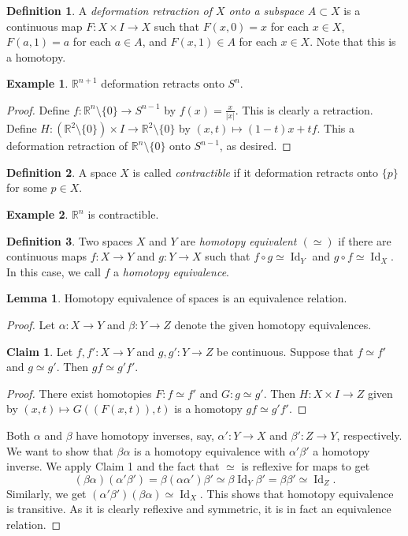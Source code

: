 \documentclass[10pt,letterpaper,cm]{nupset}
\theoremstyle{definition}
\newtheorem*{definition}{Definition}
\newtheorem{exmp}{Example}
\newtheorem{claim}{Claim}
\newtheorem{lemma}{Lemma}
\newcommand{\R}{\mathbb R}
\newcommand{\1}{\mathbf{1}}
\newcommand{\0}{\vec 0}
\DeclareMathOperator{\id}{Id}
\begin{document}
\begin{definition}
A \textit{deformation retraction of $X$ onto a subspace $A\subset X$} is a continuous map $F: X \times I \to X$ such that $F(x, 0) = x$ for each $x\in X$, $F(a, 1) = a$ for each $a\in A$, and $F(x, 1) \in A$ for each $x\in X$. Note that this is a homotopy. 
\end{definition}

\begin{exmp}  $\R^{n+1}$ deformation retracts onto $S^n$. 
\end{exmp}
\begin{proof}
Define $f: \R^n \setminus \{0\} \to S^{n-1}$ by $f(x) = \frac{x}{|x|}$. This is clearly a retraction. Define $H : (\R^2 \setminus \{0\}) \times I \to \R^2 \setminus \{0\}$ by $(x, t) \mapsto (1-t)x +tf$. This a deformation retraction of $ \R^n \setminus \{0\}$ onto $S^{n-1}$, as desired. 
\end{proof}

\begin{definition}
A space $X$ is called \textit{contractible} if it deformation retracts onto $\{p\}$ for some $p\in X$.
\end{definition}

\begin{exmp}
$\R^n$ is contractible.
\end{exmp}

\begin{definition}
Two spaces $X$ and $Y$ are \textit{homotopy equivalent $(\simeq)$} if there are continuous maps $f: X\to Y$ and $g: Y \to X$ such that $f\circ g \simeq \id_Y$ and $g\circ f \simeq \id_X$. In this case, we call $f$ a \textit{homotopy equivalence}.
\end{definition}

\begin{lemma}
Homotopy equivalence of spaces is an equivalence relation.
\end{lemma}
\begin{proof}
Let $\alpha : X \to Y$ and $\beta: Y \to Z$ denote the given homotopy equivalences. 
\begin{claim}
Let $f, f': X \to Y$ and $g,g' : Y \to Z$ be continuous. Suppose that $f\simeq f'$ and $g \simeq g'$. Then $gf \simeq g'f'$.
\end{claim}
\begin{proof}
There exist homotopies $F: f \simeq f'$ and $G: g \simeq g'$. Then $H: X \times I \to Z$ given by $(x,t) \mapsto G((F(x, t)), t)$ is a homotopy $gf \simeq g'f'$.
\end{proof}
Both $\alpha$ and $\beta$ have homotopy inverses, say, $\alpha': Y \to X$ and $\beta': Z \to Y$, respectively.  We want to show that $\beta \alpha$ is a homotopy equivalence with  $\alpha ' \beta'$ a homotopy inverse. We apply Claim 1 and the fact that $\simeq$ is reflexive for maps to get $$(\beta \alpha)(\alpha' \beta') = \beta (\alpha \alpha ') \beta ' \simeq \beta \id_Y  \beta ' = \beta \beta' \simeq \id_Z  .$$ Similarly, we get $(\alpha' \beta')(\beta \alpha) \simeq \id_X$. This shows that homotopy equivalence is transitive. As it is clearly reflexive and symmetric, it is in fact an equivalence relation. 
\end{proof}
\end{document}
